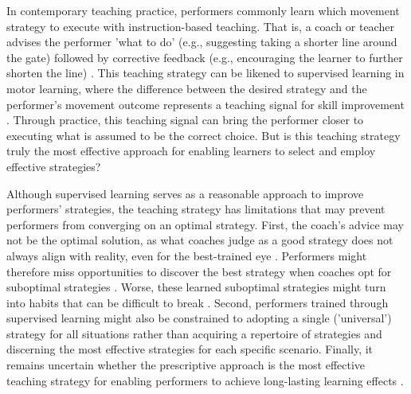 \documentclass[pdflatex,sn-nature]{sn-jnl}%
\theoremstyle{thmstyleone}%
\theoremstyle{thmstyletwo}%
\theoremstyle{thmstylethree}%
\begin{document}
In contemporary teaching practice, performers commonly learn which movement strategy to execute with instruction-based teaching. That is, a coach or teacher advises the performer 'what to do' (e.g., suggesting taking a shorter line around the gate) followed by corrective feedback (e.g., encouraging the learner to further shorten the line) \cite{williams_practice_2005, williams_effective_2023, hodges_modelling_2002}. This teaching strategy can be likened to supervised learning in motor learning, where the difference between the desired strategy and the performer's movement outcome represents a teaching signal for skill improvement  \cite{jordan_forward_1992, wolpert_motor_2010, doya_complementary_2000}. Through practice, this teaching signal can bring the performer closer to executing what is assumed to be the correct choice. But is this teaching strategy truly the most effective approach for enabling learners to select and employ effective strategies? 

Although supervised learning serves as a reasonable approach to improve performers' strategies, the teaching strategy has limitations that may prevent performers from converging on an optimal strategy. First, the coach's advice may not be the optimal solution, as what coaches judge as a good strategy does not always align with reality, even for the best-trained eye \cite{supej_impact_2019, cochrum_visual_2021}. Performers might therefore miss opportunities to discover the best strategy when coaches opt for suboptimal strategies \cite{gray_plateaus_2017}. Worse, these learned suboptimal strategies might turn into habits that can be difficult to break \cite{popp_effect_2020}. Second, performers trained through supervised learning might also be constrained to adopting a single ('universal') strategy for all situations rather than acquiring a repertoire of strategies and discerning the most effective strategies for each specific scenario. Finally, it remains uncertain whether the prescriptive approach is the most effective teaching strategy for enabling performers to achieve long-lasting learning effects \cite{wulf_instructions_1997, hodges_role_1999, williams_practice_2005,williams_effective_2023}. 
\end{document}
